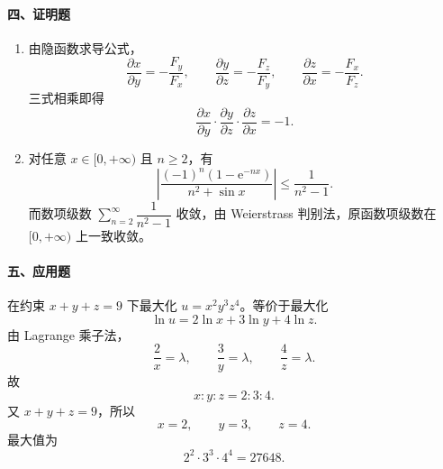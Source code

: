 \paragraph*{四、证明题}
\begin{enumerate}
  \item 由隐函数求导公式，
  \[
    \frac{\partial x}{\partial y}=-\frac{F_y}{F_x},\qquad
    \frac{\partial y}{\partial z}=-\frac{F_z}{F_y},\qquad
    \frac{\partial z}{\partial x}=-\frac{F_x}{F_z}.
  \]
  三式相乘即得
  \[
    \frac{\partial x}{\partial y}\cdot
    \frac{\partial y}{\partial z}\cdot
    \frac{\partial z}{\partial x}=-1.
  \]

  \item 对任意 \(x\in[0,+\infty)\) 且 \(n\ge2\)，有
  \[
    \left|\frac{(-1)^n(1-\mathrm{e}^{-nx})}{n^2+\sin x}\right|
    \le\frac1{n^2-1}.
  \]
  而数项级数 \(\sum_{n=2}^{\infty}\dfrac1{n^2-1}\) 收敛，由 Weierstrass 判别法，原函数项级数在 \([0,+\infty)\) 上一致收敛。
\end{enumerate}

\paragraph*{五、应用题}
在约束 \(x+y+z=9\) 下最大化 \(u=x^2y^3z^4\)。等价于最大化
\[
  \ln u=2\ln x+3\ln y+4\ln z.
  \]
由 Lagrange 乘子法，
\[
  \frac2x=\lambda,\qquad \frac3y=\lambda,\qquad \frac4z=\lambda.
  \]
故
\[
  x:y:z=2:3:4.
  \]
又 \(x+y+z=9\)，所以
\[
  x=2,\qquad y=3,\qquad z=4.
  \]
最大值为
\[
  2^2\cdot3^3\cdot4^4=27648.
\]
